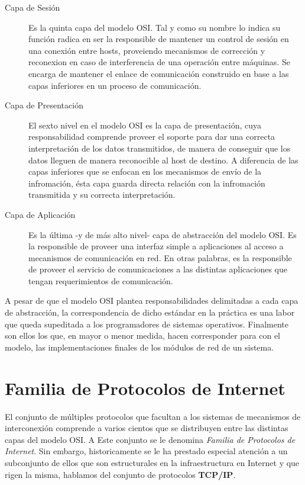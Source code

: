 \begin{description}
\item[Capa de Sesión] Es la quinta capa del modelo OSI. Tal y como su nombre lo indica su función radica en ser la responsible de mantener un control de sesión en una conexión entre hosts, proveiendo mecanismos de corrección y reconexion en caso de interferencia de una operación entre máquinas. Se encarga de mantener el enlace de comunicación construido en base a las capas inferiores en un proceso de comunicación.

\item[Capa de Presentación] El sexto nivel en el modelo OSI es la capa de presentación, cuya responsabilidad comprende proveer el soporte para dar una correcta interpretación de los datos transmitidos, de manera de conseguir que los datos lleguen de manera reconocible al host de destino. A diferencia de las capas inferiores que se enfocan en los mecanismos de envío de la infromación, ésta capa guarda directa relación con la infromación transmitida y su correcta interpretación.

\item[Capa de Aplicación] Es la última -y de más alto nivel- capa de abstracción del modelo OSI. Es la responsible de proveer una interfaz simple a aplicaciones al acceso a mecanismos de comunicación en red. En otras palabras, es la responsible de proveer el servicio de comunicaciones a las distintas aplicaciones que tengan requerimientos de comunicación.

\end{description}

A pesar de que el modelo OSI plantea responsabilidades delimitadas a cada capa de abstracción, la correspondencia de dicho estándar en la práctica es una labor que queda supeditada a los programadores de sistemas operativos. Finalmente son ellos los que, en mayor o menor medida, hacen corresponder para con el modelo, las implementaciones finales de los módulos de red de un sistema.


\section{Familia de Protocolos de Internet}
El conjunto de múltiples protocolos que facultan a los sistemas de mecanismos de interconexión comprende a varios cientos que se distribuyen entre las distintas capas del modelo OSI. A Este conjunto se le denomina \emph{Familia de Protocolos de Internet}. Sin embargo, historicamente se le ha prestado especial atención a un subconjunto de ellos que son estructurales en la infraestructura en Internet y que rigen la misma, hablamos del conjunto de protocolos \textbf{TCP/IP}.

